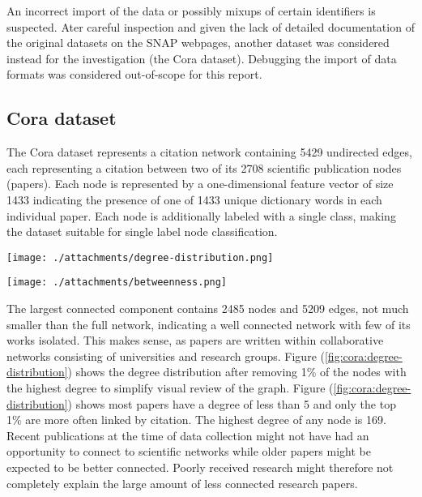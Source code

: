 \documentclass[a4paper,10pt]{article}
\begin{document}
An incorrect import of the data or possibly mixups of certain identifiers is suspected. Ater careful inspection and given the lack of detailed documentation of the original datasets on the SNAP webpages, another dataset was considered instead for the investigation (the Cora dataset). Debugging the import of data formats was considered out-of-scope for this report.

\subsection{Cora dataset}

The Cora dataset represents a citation network containing 5429 undirected edges, each representing a citation between two of its 2708 scientific publication nodes (papers). Each node is represented by a one-dimensional feature vector of size 1433 indicating the presence of one of 1433 unique dictionary words in each individual paper. Each node is additionally labeled with a single class, making the dataset suitable for single label node classification.

\begin{minipage}[c][17em]{0.45\textwidth}
  \texttt{[image: ./attachments/degree-distribution.png]}
  \label{fig:cora:degree-distribution}
\end{minipage}
\hfill
\begin{minipage}[c][17em]{0.45\textwidth}
  \texttt{[image: ./attachments/betweenness.png]}
  \label{fig:cora:betweenness-distribution}
\end{minipage}

The largest connected component contains 2485 nodes and 5209 edges, not much smaller than the full network, indicating a well connected network with few of its works isolated. This makes sense, as papers are written within collaborative networks consisting of universities and research groups. Figure (\ref{fig:cora:degree-distribution}) shows the degree distribution after removing 1\% of the nodes with the highest degree to simplify visual review of the graph. Figure (\ref{fig:cora:degree-distribution}) shows most papers have a degree of less than 5 and only the top 1\% are more often linked by citation. The highest degree of any node is 169. Recent publications at the time of data collection might not have had an opportunity to connect to scientific networks while older papers might be expected to be better connected. Poorly received research might therefore not completely explain the large amount of less connected research papers.
\end{document}

